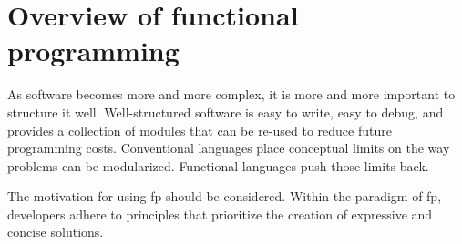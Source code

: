 \chapter{Overview of functional programming}\label{chap:functional-programming}
\begin{shaded}
    \noindent
    \glqq{}As software becomes more and more complex, it is more and more important to structure it well. Well-structured software is easy to write, easy to debug, and provides a collection of modules that can be re-used to reduce future programming costs. Conventional languages place conceptual limits on the way problems can be modularized. Functional languages push those limits back.\grqq{} \cite{Hughes1989}
\end{shaded}

The motivation for using \ac{fp} should be considered. Within the paradigm of \ac{fp}, developers adhere to principles that prioritize the creation of expressive and concise solutions.
    

